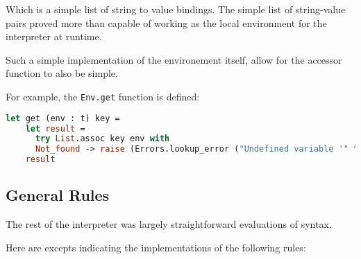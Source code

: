 \documentclass{l4proj}
\begin{document}
Which is a simple list of string to value bindings.
The simple list of string-value pairs proved more than capable of working as the local environment for the interpreter at runtime.

Such a simple implementation of the environement itself, allow for the accessor function to also be simple.

For example, the \texttt{Env.get} function is defined:

\begin{lstlisting}[language=Caml, caption=PyFunc's Interpreter Environment get function.]
    let get (env : t) key =
    let result = 
      try List.assoc key env with 
      Not_found -> raise (Errors.lookup_error ("Undefined variable '" ^ key ^ "'!")) in
    result
\end{lstlisting}






\subsection{General Rules}
The rest of the interpreter was largely straightforward evaluations of syntax.

Here are excepts indicating the implementations of the following rules:
\end{document}

